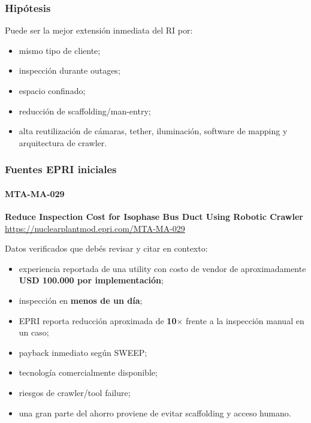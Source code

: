 \documentclass[11pt,a4paper]{article}
\begin{document}
\subsubsection*{Hipótesis}
Puede ser la mejor extensión inmediata del RI por:

\begin{itemize}
\item mismo tipo de cliente;
\item inspección durante outages;
\item espacio confinado;
\item reducción de scaffolding/man-entry;
\item alta reutilización de cámaras, tether, iluminación, software de mapping y arquitectura de crawler.
\end{itemize}


\subsubsection*{Fuentes EPRI iniciales}

\paragraph*{MTA-MA-029}
\textbf{Reduce Inspection Cost for Isophase Bus Duct Using Robotic Crawler} \\
\url{https://nuclearplantmod.epri.com/MTA-MA-029}

Datos verificados que debés revisar y citar en contexto:

\begin{itemize}
\item experiencia reportada de una utility con costo de vendor de aproximadamente \textbf{USD 100.000 por implementación};
\item inspección en \textbf{menos de un día};
\item EPRI reporta reducción aproximada de \textbf{10$\times$} frente a la inspección manual en un caso;
\item payback inmediato según SWEEP;
\item tecnología comercialmente disponible;
\item riesgos de crawler/tool failure;
\item una gran parte del ahorro proviene de evitar scaffolding y acceso humano.
\end{itemize}
\end{document}
